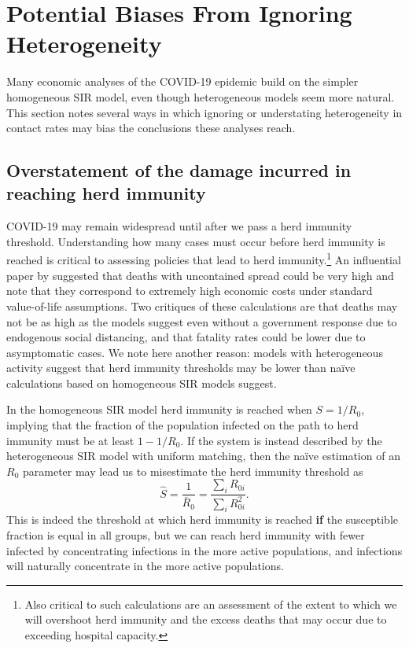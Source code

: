 \documentclass[11pt]{article}
\begin{document}
\section{Potential Biases From Ignoring Heterogeneity}

Many economic analyses of the COVID-19 epidemic build on the simpler homogeneous SIR model, even though 
heterogeneous models seem more natural. This section notes several ways in which ignoring or understating heterogeneity in
contact rates may bias the conclusions these analyses reach.

\subsection{Overstatement of the damage incurred in reaching herd immunity}

COVID-19 may remain widespread until after we pass a herd immunity threshold. Understanding how many cases must occur
before herd immunity is reached is critical to assessing policies that lead to herd immunity.\footnote{Also critical to such calculations
are an assessment of the extent to which we will overshoot herd immunity and the excess deaths that may occur due to exceeding
hospital capacity.} An influential paper by \citet{ferguson2020impact} suggested that deaths with uncontained spread could be very high and 
\citet{greenstone2020does} note that they correspond to extremely high economic costs under standard value-of-life 
assumptions. Two critiques of these calculations are that deaths may not be as high as the models suggest even without a 
government response due to endogenous social distancing, and that fatality rates could be lower due to asymptomatic cases. We note
here another reason: models with heterogeneous activity suggest that herd immunity thresholds may be lower than na\"ive
calculations based on homogeneous SIR models suggest.

In the homogeneous SIR model herd immunity is reached when $S = 1/R_0$, implying that the fraction of the population 
infected on the path to herd immunity must be at least $1 - 1/R_0$. If the system is instead described by the heterogeneous
SIR model with uniform matching, then the na\"ive estimation of an $R_0$ parameter may lead us to misestimate the herd 
immunity threshold as 
$$
\hat{S} = \frac{1}{{\overline{R}}_0} = \frac{\sum_i R_{0i}}{\sum_i R_{0i}^2}.
$$
This is indeed the threshold at which herd immunity is reached \textbf{if} the susceptible fraction is equal in all groups, but 
we can reach herd immunity with fewer infected by concentrating infections in the more active populations, and infections
will naturally concentrate in the more active populations.
\end{document}
